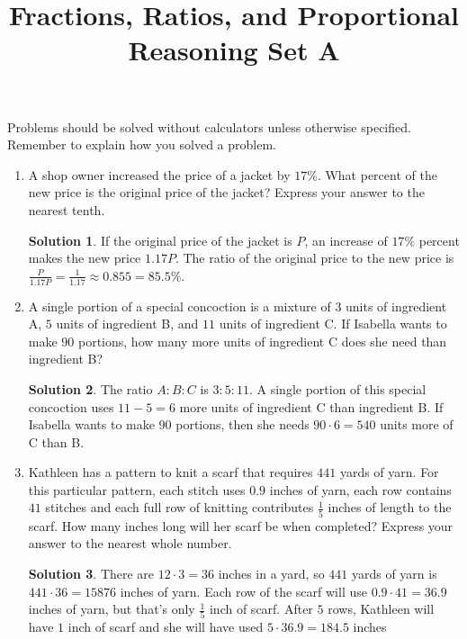 \documentclass{article}
\title{Fractions, Ratios, and Proportional Reasoning Set A}
\author{}
\date{}
\theoremstyle{definition}
\newtheorem*{solution}{Solution}
\begin{document}
    \maketitle
    \noindent Problems should be solved without calculators unless otherwise
    specified. Remember to explain how you solved a problem.
    \begin{enumerate}
        \item A shop owner increased the price of a jacket by $17\%$. What
        percent of the new price is the original price of the jacket? Express
        your answer to the nearest tenth.
        \begin{solution}
            If the original price of the jacket is $P$, an increase of $17\%$
            percent makes the new price $1.17P$. The ratio of the original price
            to the new price is $\frac{P}{1.17P} = \frac{1}{1.17} \approx 0.855
            = 85.5\%$.
        \end{solution}
        \item A single portion of a special concoction is a mixture of $3$ units
        of ingredient A, $5$ units of ingredient B, and $11$ units of ingredient
        C. If Isabella wants to make $90$ portions, how many more units of
        ingredient C does she need than ingredient B?
        \begin{solution}
            The ratio $A : B : C$ is $3 : 5 : 11$. A single portion of this
            special concoction uses $11 - 5 = 6$ more units of ingredient C than
            ingredient B. If Isabella wants to make $90$ portions, then she
            needs $90 \cdot 6 = 540$ units more of C than B.
        \end{solution}
        \item Kathleen has a pattern to knit a scarf that requires $441$ yards
        of yarn. For this particular pattern, each stitch uses $0.9$ inches of
        yarn, each row contains $41$ stitches and each full row of knitting
        contributes $\frac{1}{5}$ inches of length to the scarf. How many inches
        long will her scarf be when completed? Express your answer to the
        nearest whole number.
        \begin{solution}
            There are $12 \cdot 3 = 36$ inches in a yard, so $441$ yards of yarn
            is $441 \cdot 36 = 15876$ inches of yarn. Each row of the scarf will
            use $0.9 \cdot 41 = 36.9$ inches of yarn, but that’s only
            $\frac{1}{5}$ inch of scarf. After $5$ rows, Kathleen will have $1$
            inch of scarf and she will have used $5 \cdot 36.9 = 184.5$ inches

\end{solution}
\end{enumerate}
\end{document}
